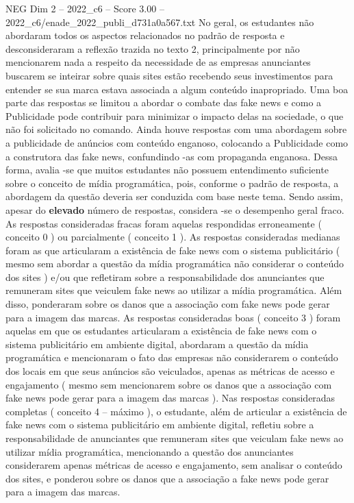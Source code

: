 \begin{textsample}{NEG Dim 2 – 2022\_c6 – Score 3.00 – 2022\_c6/enade\_2022\_publi\_d731a0a567.txt}
No geral, os estudantes não abordaram todos os aspectos relacionados no padrão de resposta e desconsideraram a reflexão trazida no texto 2, principalmente por não mencionarem nada a respeito da necessidade de as empresas anunciantes buscarem se inteirar sobre quais sites estão recebendo seus investimentos para entender se sua marca estava associada a algum conteúdo inapropriado.
Uma boa parte das respostas se limitou a abordar o combate das fake news e como a Publicidade pode contribuir para minimizar o impacto delas na sociedade, o que não foi solicitado no comando.
Ainda houve respostas com uma abordagem sobre a publicidade de anúncios com conteúdo enganoso, colocando a Publicidade como a construtora das fake news, confundindo -as com propaganda enganosa.
Dessa forma, avalia -se que muitos estudantes não possuem entendimento suficiente sobre o conceito de mídia programática, pois, conforme o padrão de resposta, a abordagem da questão deveria ser conduzida com base neste tema.
Sendo assim, apesar do \textbf{elevado} número de respostas, considera -se o desempenho geral fraco.
As respostas consideradas fracas foram aquelas respondidas erroneamente ( conceito 0 ) ou parcialmente ( conceito 1 ).
As respostas consideradas medianas foram as que articularam a existência de fake news com o sistema publicitário ( mesmo sem abordar a questão da mídia programática não considerar o conteúdo dos sites ) e/ou que refletiram sobre a responsabilidade dos anunciantes que remuneram sites que veiculem fake news ao utilizar a mídia programática.
Além disso, ponderaram sobre os danos que a associação com fake news pode gerar para a imagem das marcas.
As respostas consideradas boas ( conceito 3 ) foram aquelas em que os estudantes articularam a existência de fake news com o sistema publicitário em ambiente digital, abordaram a questão da mídia programática e mencionaram o fato das empresas não considerarem o conteúdo dos locais em que seus anúncios são veiculados, apenas as métricas de acesso e engajamento ( mesmo sem mencionarem sobre os danos que a associação com fake news pode gerar para a imagem das marcas ).
Nas respostas consideradas completas ( conceito 4 – máximo ), o estudante, além de articular a existência de fake news com o sistema publicitário em ambiente digital, refletiu sobre a responsabilidade de anunciantes que remuneram sites que veiculam fake news ao utilizar mídia programática, mencionando a questão dos anunciantes considerarem apenas métricas de acesso e engajamento, sem analisar o conteúdo dos sites, e ponderou sobre os danos que a associação a fake news pode gerar para a imagem das marcas.

\end{textsample}
